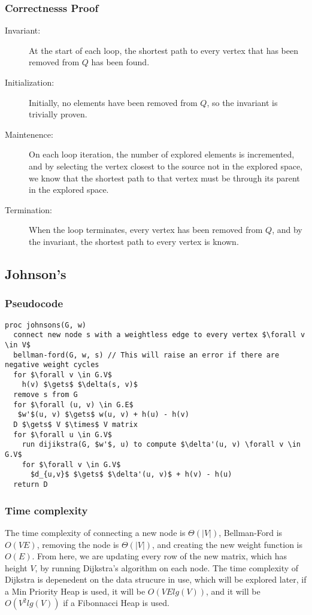 \documentclass[a4paper,12pt]{article}
\begin{document}
\subsubsection{Correctnesss Proof}
\begin{description}
\item [Invariant: ] At the start of each loop, the shortest path to every vertex that has been removed from $Q$ has been found.
\item [Initialization: ] Initially, no elements have been removed from $Q$, so the invariant is trivially proven.
\item [Maintenence: ] On each loop iteration, the number of explored elements is incremented, and by selecting the vertex closest to the source not in the explored space, we know that the shortest path to that vertex must be through its parent in the explored space.
\item [Termination: ] When the loop terminates, every vertex has been removed from $Q$, and by the invariant, the shortest path to every vertex is known.
\end{description}
\subsection{Johnson's}
\subsubsection{Pseudocode}
\begin{lstlisting}[mathescape=true]
proc johnsons(G, w)
  connect new node s with a weightless edge to every vertex $\forall v \in V$
  bellman-ford(G, w, s) // This will raise an error if there are negative weight cycles
  for $\forall v \in G.V$
    h(v) $\gets$ $\delta(s, v)$
  remove s from G
  for $\forall (u, v) \in G.E$
   $w'$(u, v) $\gets$ w(u, v) + h(u) - h(v)
  D $\gets$ V $\times$ V matrix
  for $\forall u \in G.V$
    run dijikstra(G, $w'$, u) to compute $\delta'(u, v) \forall v \in G.V$
    for $\forall v \in G.V$
      $d_{u,v}$ $\gets$ $\delta'(u, v)$ + h(v) - h(u)
  return D
\end{lstlisting}
\subsubsection{Time complexity}
The time complexity of connecting a new node is $\Theta(|V|)$, Bellman-Ford is $O(VE)$, removing the node is $\Theta(|V|)$, and creating the new weight function is $O(E)$. From here, we are updating every row of the new matrix, which has height $V$, by running Dijkstra's algorithm on each node. The time complexity of Dijkstra is depenedent on the data strucure in use, which will be explored later, if a Min Priority Heap is used, it will be $O(VElg(V))$, and it will be $O(V^2lg(V))$ if a Fibonnacci Heap is used.
\end{document}
